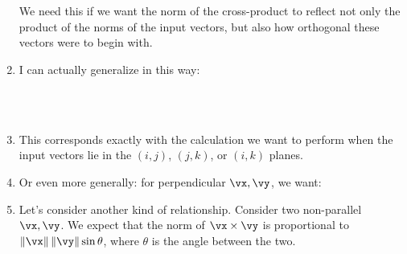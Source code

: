 \begin{enumerate}
  \begin{nedqn}
    \vi \cross \vi
  \eqcol
  \\
    \vj \cross \vj
  \eqcol
  \\
    \vk \cross \vk
  \eqcol
  \end{nedqn}

  \noindent
  We need this if we want the norm of the cross-product to reflect not
  only the product of the norms of the input vectors, but also how
  orthogonal these vectors were to begin with.

  \item I can actually generalize in this way:

  \begin{nedqn}
    \alpha \parens{
      \cos\theta \vi + \sin\theta \vj
    }
    \cross
    \beta \parens{
      \cos\phi \vj - \sin\phi \vi
    }
  \eqcol
    \alpha\beta {} \vk
  \\
    \alpha \parens{
      \cos\theta \vj + \sin\theta \vk
    }
    \cross
    \beta \parens{
      \cos\phi \vk - \sin\phi \vj
    }
  \eqcol
    \alpha\beta {} \vi
  \\
    \alpha \parens{
      \cos\theta \vk + \sin\theta \vi
    }
    \cross
    \beta \parens{
      \cos\phi \vi - \sin\phi \vk
    }
  \eqcol
    \alpha\beta {} \vj
  \end{nedqn}

  \item This corresponds exactly with the calculation we want to perform
  when the input vectors lie in the $(i,j)$, $(j,k)$, or $(i,k)$ planes.

  \item Or even more generally: for perpendicular $\vx, \vy$, we want:

  \begin{nedqn}
    \alpha \parens{
      \cos\theta \vx + \sin\theta \vy
    }
    \cross
    \beta \parens{
      \cos\phi \vy - \sin\phi \vx
    }
  \eqcol
    \alpha\beta
    \parens{\vx \cross \vy}
  \end{nedqn}

  \item Let's consider another kind of relationship. Consider two
  non-parallel $\vx, \vy$. We expect that the norm of $\vx \cross \vy$
  is proportional to $\norm{\vx} \norm{\vy} \sin\theta$, where $\theta$
  is the angle between the two.


\end{enumerate}
